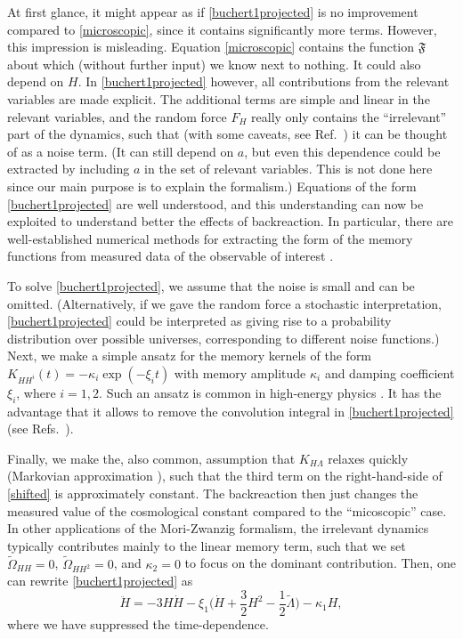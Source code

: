 \documentclass[aps,prl,twocolumn,10pt,superscriptaddress,nofootinbib,balancelastpage]{revtex4-1}
\newcommand{\ZT}[1]{\textquotedblleft#1\textquotedblright}%
\begin{document}
At first glance, it might appear as if \cref{buchert1projected} is no improvement compared to \cref{microscopic}, since it contains significantly more terms. However, this impression is misleading. Equation \eqref{microscopic} contains the function $\mathfrak{F}$ about which (without further input) we know next to nothing. It could also depend on $H$. In \cref{buchert1projected} however, all contributions from the relevant variables are made explicit. The additional terms are simple and linear in the relevant variables, and the random force $F_H$ really only contains the \ZT{irrelevant} part of the dynamics, such that (with some caveats, see Ref.\ \cite{EspanolO1993}) it can be thought of as a noise term. (It can still depend on $a$, but even this dependence could be extracted by including $a$ in the set of relevant variables. This is not done here since our main purpose is to explain the formalism.) Equations of the form \eqref{buchert1projected} are well understood, and this understanding can now be exploited to understand better the effects of backreaction. In particular, there are well-established numerical methods for extracting the form of the memory functions from measured data of the observable of interest \cite{MeyerPS2020,MeyerWSS2020,BerkowitzMKM1981}.

To solve \cref{buchert1projected}, we assume that the noise is small and can be omitted. (Alternatively, if we gave the random force a stochastic interpretation, \cref{buchert1projected} could be interpreted as giving rise to a probability distribution over possible universes, corresponding to different noise functions.) Next, we make a simple ansatz for the memory kernels of the form $K_{HH^i}(t)= - \kappa_i \exp(-\xi_i t)$ with memory amplitude $\kappa_i$ and damping coefficient $\xi_i$, where $i=1,2$. Such an ansatz is common in high-energy physics \cite{KoideKR2006,KoideDMK2007}. It has the advantage that it allows to remove the convolution integral in \cref{buchert1projected} (see Refs.\ \cite{KoideKR2006,teVrugtJW2021}). 

Finally, we make the, also common, assumption that $K_{H\Lambda}$ relaxes quickly (Markovian approximation \cite{RauM1996}), such that the third term on the right-hand-side of \cref{shifted} is approximately constant. The backreaction then just changes the measured value of the cosmological constant compared to the \ZT{micoscopic} case. In other applications of the Mori-Zwanzig formalism, the irrelevant dynamics typically contributes mainly to the linear memory term, such that we set $\tilde{\Omega}_{HH}=0$, $\tilde{\Omega}_{HH^2}=0$, and $\kappa_2=0$ to focus on the dominant contribution. Then, one can rewrite \cref{buchert1projected} as
\begin{equation}
\ddot{H}=-3H\dot{H} -\xi_1\bigg(\dot{H}+\frac{3}{2}H^2-\frac{1}{2}\tilde{\Lambda}\bigg)- \kappa_1 H, \label{eins}
\end{equation}
where we have suppressed the time-dependence.
\end{document}
